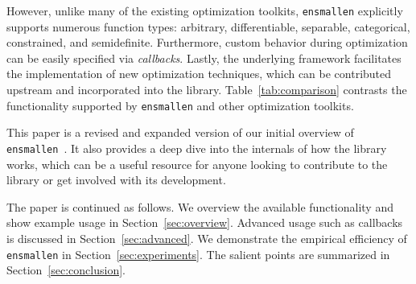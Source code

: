 However, unlike many of the existing optimization toolkits,
{\tt ensmallen} explicitly supports numerous function types:
arbitrary, differentiable, separable, categorical, constrained, and semidefinite.
Furthermore, custom behavior during optimization can be easily specified via {\it callbacks}.
Lastly, the underlying framework facilitates the implementation of new optimization techniques,
which can be contributed upstream and incorporated into the library.
Table~\ref{tab:comparison} contrasts the functionality supported
by {\tt ensmallen} and other optimization toolkits.

This paper is a revised and expanded version of our initial overview
of {\tt ensmallen}~\cite{ensmallen2018}. 
It also provides a deep dive into the internals
of how the library works, which can be a useful resource for anyone looking
to contribute to the library or get involved with its development.


The paper is continued as follows.
We overview the available functionality and show example usage in Section~\ref{sec:overview}.
Advanced usage such as callbacks is discussed in Section~\ref{sec:advanced}.
We demonstrate the empirical efficiency of {\tt ensmallen} in Section~\ref{sec:experiments}.
The salient points are summarized in Section~\ref{sec:conclusion}.


